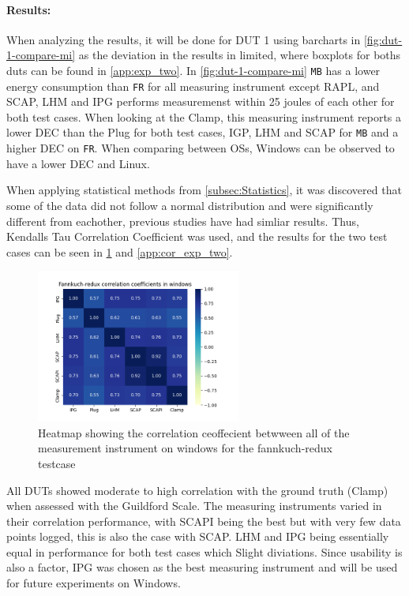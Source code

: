 

\paragraph{Results:} When analyzing the results, it will be done for DUT 1 using barcharts in \cref{fig:dut-1-compare-mi} as the deviation in the results in limited, where boxplots for boths duts can be found in \cref{app:exp_two}. In \cref{fig:dut-1-compare-mi} \texttt{MB} has a lower energy consumption than \texttt{FR} for all measuring instrument except RAPL, and SCAP, LHM and IPG performs measuremenst within 25 joules of each other for both test cases. When looking at the Clamp, this measuring instrument reports a lower DEC than the Plug for both test cases, IGP, LHM and SCAP for \texttt{MB} and a higher DEC on \texttt{FR}. When comparing between OSs, Windows can be observed to have a lower DEC and Linux.



When applying statistical methods from \cref{subsec:Statistics}, it was discovered that some of the data did not follow a normal distribution and were significantly different from eachother, previous studies \cite{biksbois, Koedijk2022diff} have had simliar results. Thus, Kendalls Tau Correlation Coefficient was used, and the results for the two test cases can be seen in \cref{fig:fannkuchCorr} and \cref{app:cor_exp_two}.

\begin{figure}[H]
    \centering
    \hspace*{-1cm} %
    \includegraphics[width=0.6\textwidth]{figures/Fannkuch-redux_ex2.png}
    \caption{Heatmap showing the correlation ceoffecient betwween all of the measurement instrument on windows for the fannkuch-redux testcase}
    \label{fig:fannkuchCorr}
\end{figure}


All DUTs showed moderate to high correlation with the ground truth (Clamp) when assessed with the Guildford Scale. The measuring instruments varied in their correlation performance, with SCAPI being the best but with very few data points logged, this is also the case with SCAP. LHM and IPG being essentially equal in performance for both test cases which Slight diviations. Since usability is also a factor, IPG was chosen as the best measuring instrument and will be used for future experiments on Windows.


